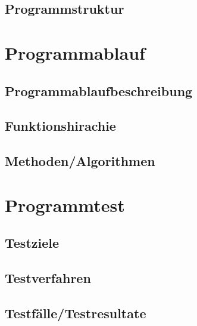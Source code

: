 \documentclass[11pt]{article}
\begin{document}
  \subsection{Programmstruktur}
  
  
  \section{Programmablauf}
  \subsection{Programmablaufbeschreibung} 
  \subsection{Funktionshirachie}
  \subsection{Methoden/Algorithmen}
  
   \section{Programmtest}
  \subsection{Testziele}
  \subsection{Testverfahren}
  \subsection{Testfälle/Testresultate}
   
   
 
\newpage
\end{document}
